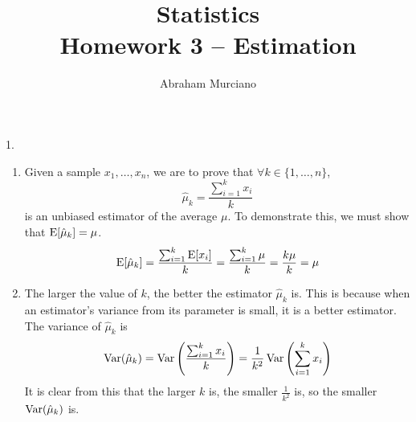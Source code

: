 \documentclass[fleqn]{article}
\title{
	Statistics \\
	\medskip
	\large Homework 3 -- Estimation
}
\author{Abraham Murciano}
\begin{document}
\maketitle

\begin{answers}

	\item[1.]
	\begin{enumerate}
		\item %
			Given a sample \(x_1, \dots, x_n\), we are to prove that \(\forall k \in \{1, \dots, n\}\),
			\[\hat{\mu}_k = \frac{\sum_{i=1}^k x_i}{k}\]
			is an unbiased estimator of the average \(\mu\). To demonstrate this, we must show that \(\operatorname{E}[\hat{\mu}_k] = \mu\).
			\[\operatorname{E}[\hat{\mu}_k] = \frac{\sum_{i=1}^k \operatorname{E}[x_i]}{k} = \frac{\sum_{i=1}^k \mu}{k} = \frac{k \mu}{k} = \mu\]

		\item %
			The larger the value of \(k\), the better the estimator \(\hat\mu_k\) is. This is because when an estimator's variance from its parameter is small, it is a better estimator. The variance of \(\hat{\mu}_k\) is
			\[
				\operatorname{Var}(\hat{\mu}_k)
				= \operatorname{Var}\left(\frac{\sum_{i=1}^k x_i}{k}\right)
				= \frac{1}{k^2} \operatorname{Var}\left(\sum_{i=1}^k x_i\right)
			\]
			It is clear from this that the larger \(k\) is, the smaller \(\frac{1}{k^2}\) is, so the smaller \(\operatorname{Var}(\hat{\mu}_k)\) is.
	\end{enumerate}

\end{answers}
\end{document}
